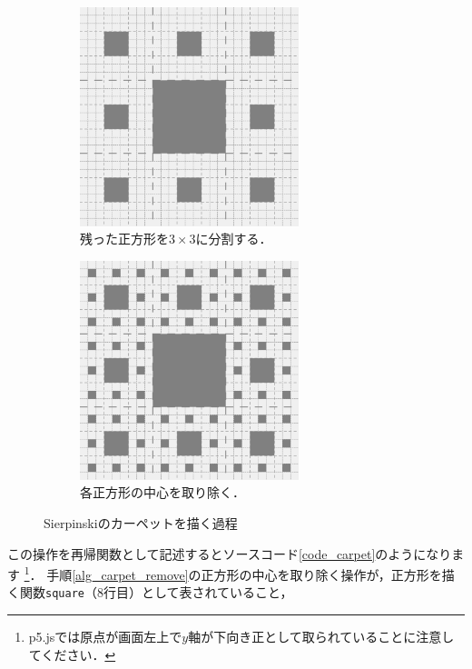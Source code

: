 \documentclass[dvipdfmx]{jsarticle}
\theoremstyle{definition}
\begin{document}
\begin{figure}[H]
\begin{subfigure}{0.325\textwidth}
        \includegraphics[width=0.7\textwidth]{figure/carpet/carpet_3_split.png}
        \caption{残った正方形を$3 \times 3$に分割する．}
    \end{subfigure}
    \begin{subfigure}{0.325\textwidth}
        \centering
        \includegraphics[width=0.7\textwidth]{figure/carpet/carpet_3_fill.png}
        \caption{各正方形の中心を取り除く．}
    \end{subfigure}
    \caption{Sierpinskiのカーペットを描く過程}
    \label{fig_process_carpet}
\end{figure}
%
この操作を再帰関数として記述するとソースコード\ref{code_carpet}のようになります
\footnote{
    p5.jsでは原点が画面左上で$y$軸が下向き正として取られていることに注意してください．
}．
手順\ref{alg_carpet_remove}の正方形の中心を取り除く操作が，正方形を描く関数\verb|square|（8行目）として表されていること，
\end{document}
